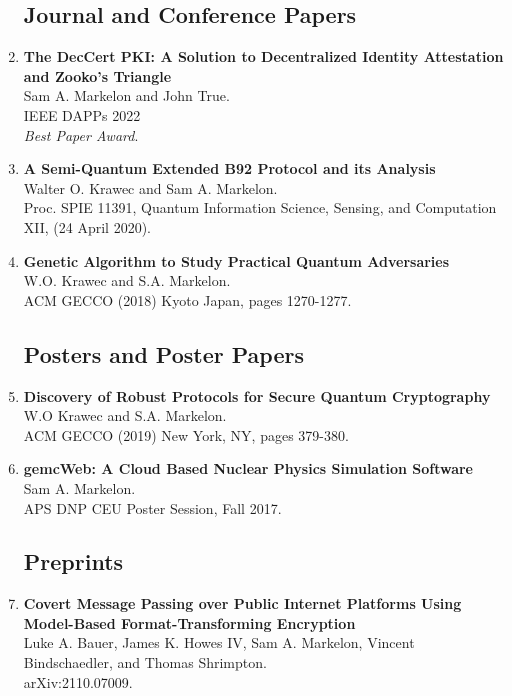 \documentclass[10pt]{article}
\begin{document}
\begin{enumerate}
  
\subsection*{Journal and Conference Papers}

\item {\bf The DecCert PKI: A Solution to Decentralized Identity Attestation and Zooko's Triangle}\\
Sam A. Markelon and John True.\\
IEEE DAPPs 2022\\
\textit{Best Paper Award}.

\item {\bf A Semi-Quantum Extended B92 Protocol and its Analysis}\\
Walter O. Krawec and Sam A. Markelon. \\
Proc. SPIE 11391, Quantum Information Science, Sensing, and Computation XII, (24 April 2020).


\item {\bf Genetic Algorithm to Study Practical Quantum Adversaries}\\
  W.O. Krawec and S.A. Markelon.\\
  ACM GECCO (2018) Kyoto Japan, pages 1270-1277.

\subsection*{Posters and Poster Papers}

\item {\bf Discovery of Robust Protocols for Secure Quantum Cryptography}\\
  W.O Krawec and S.A. Markelon.\\
  ACM GECCO (2019) New York, NY, pages 379-380.

\item {\bf gemcWeb: A Cloud Based Nuclear Physics Simulation Software}\\
  Sam A. Markelon.\\
  APS DNP CEU Poster Session, Fall 2017.

\subsection*{Preprints}

\item {\bf Covert Message Passing over Public Internet Platforms Using Model-Based Format-Transforming Encryption}\\
  Luke A. Bauer, James K. Howes IV, Sam A. Markelon, Vincent Bindschaedler, and Thomas Shrimpton.\\
  arXiv:2110.07009.

\end{enumerate}
\end{document}
